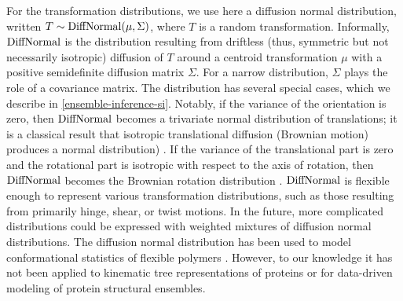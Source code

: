 \documentclass[../../main.tex]{subfiles}
\begin{document}
\begin{refsection}

	For the transformation distributions, we use here a diffusion normal distribution, written
	$T \sim \operatorname{DiffNormal}(\mu, \Sigma)$,
	where $T$ is a random transformation.
	Informally, $\operatorname{DiffNormal}$ is the distribution resulting from driftless (thus, symmetric but not necessarily isotropic) diffusion of $T$ around a centroid transformation $\mu$ with a positive semidefinite diffusion matrix $\Sigma$.
	For a narrow distribution, $\Sigma$ plays the role of a covariance matrix.
	The distribution has several special cases, which we describe in \cref{ensemble-inference-si}.
	Notably, if the variance of the orientation is zero, then $\operatorname{DiffNormal}$ becomes a trivariate normal distribution of translations; it is a classical result that isotropic translational diffusion (\ie Brownian motion) produces a normal distribution) \supercite{einsteinInvestigationsTheoryBrownian1956}.
	If the variance of the translational part is zero and the rotational part is isotropic with respect to the axis of rotation, then $\operatorname{DiffNormal}$ becomes the Brownian rotation distribution \supercite{perrinEtudeMathematiqueMouvement1928}.
	$\operatorname{DiffNormal}$ is flexible enough to represent various transformation distributions, such as those resulting from primarily hinge, shear, or twist motions.
	In the future, more complicated distributions could be expressed with weighted mixtures of diffusion normal distributions.
	The diffusion normal distribution has been used to model conformational statistics of flexible polymers \supercite{chirikjianConformationalStatisticsStiff2000,chirikjianConformationalStatisticsMacromolecules2001}.
	However, to our knowledge it has not been applied to kinematic tree representations of proteins or for data-driven modeling of protein structural ensembles.




\end{refsection}
\end{document}
